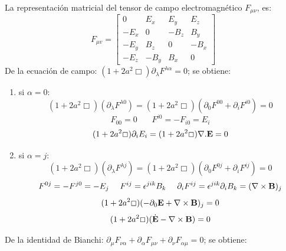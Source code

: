 \documentclass[a4paper,12pt]{article}
\begin{document}
La representación matricial del tensor de campo electromagnético $F_{\mu\nu}$, es:
\begin{equation}
F_{\mu v}=\left[\begin{matrix}
0   & E_x & E_y  & E_z\\
-E_x &   0  & -B_z  &  B_y\\
-E_y &  B_z &   0   & -B_x\\
-E_z & -B_y &  B_x  &   0
\end{matrix}\right] 
\label{tel}
\end{equation}
De la ecuación de campo: $(1+2a^2\Box)\partial_{\lambda}F^{\lambda\alpha}=0$; se obtiene:
\begin{enumerate}
 \item[\fbox{1.}] si $\alpha=0$:
\\
\begin{equation}
(1+2a^2\Box)(\partial_{\lambda}F^{\lambda0})=(1+2a^2\Box)(\partial_{0}F^{00}+\partial_{i}F^{i0})=0 
\end{equation}
$$F_{00}=0\ \ \ \ \ \ \ \ F^{i0}=-F_{i0}=E_i$$
\begin{equation}
(1+2a^2\Box)\partial_{i}E_i=(1+2a^2\Box){\bf \nabla.E} = 0 
\end{equation}
\item[\fbox{2.}] si $\alpha=j$:
\\
\begin{equation}
(1+2a^2\Box)(\partial_{\lambda}F^{\lambda j})=(1+2a^2\Box)(\partial_{0}F^{0j}+\partial_{i}F^{ij})=0 
\end{equation}
$$F^{0j}=-F^{j0}=-E_j \ \  \  \  F^{ij}=\epsilon^{jik}B_k  \  \  \  \ \partial_{i}F^{ij}=\epsilon^{jik}\partial_{i}B_k=(\nabla \times {\bf B})_j$$
\begin{equation}
(1+2a^2\Box)(-\partial_0{\bf E}+\nabla \times {\bf B} )_j = 0 
\end{equation}
\begin{equation}
(1+2a^2\Box)(\dot{\bf E}-\nabla \times {\bf B} )= 0 
\end{equation}  
\end{enumerate}
De la identidad de Bianchi: $\partial_\mu F_{\nu\alpha}+\partial_\alpha F_{\mu\nu}+\partial_\nu F_{\alpha\mu}=0 $; se obtiene: 
\end{document}
